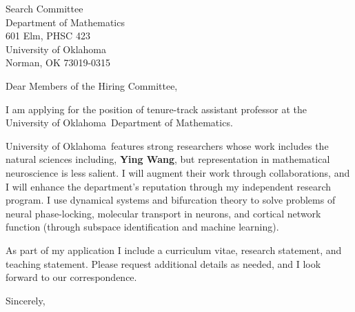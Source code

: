 \documentclass[11pt,a4paper]{letter}
\begin{document}
\def\School{University of Oklahoma}
\begin{letter}
{Search Committee\\
Department of Mathematics\\
601 Elm, PHSC 423\\
University of Oklahoma\\
Norman, OK 73019-0315
}


\opening{Dear Members of the Hiring Committee,}

I am applying for the position of tenure-track assistant professor at the \School~Department of Mathematics. 



\School~features strong researchers whose work includes the natural sciences including, \textbf{Ying Wang}, but representation in mathematical neuroscience is less salient. I will augment their work through collaborations, and I will enhance the department's reputation through my independent research program. I use dynamical systems and bifurcation theory to solve problems of neural phase-locking, molecular transport in neurons, and cortical network function (through subspace identification and machine learning).



As part of my application I include a curriculum vitae, research statement, and teaching statement. Please request additional details as needed, and I look forward to our correspondence.

\closing{Sincerely,}
\end{letter}
\end{document}
